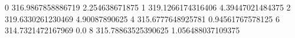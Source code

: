 0 316.9867858886719 2.254638671875
1 319.1266174316406 4.39447021484375
2 319.6330261230469 4.90087890625
4 315.6777648925781 0.94561767578125
6 314.7321472167969 0.0
8 315.78863525390625 1.056488037109375
